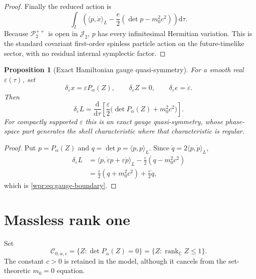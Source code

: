 \documentclass[11pt]{article}
\newtheorem{proposition}[theorem]{Proposition}
\newcommand{\J}{\mathcal J_2}
\newcommand{\Ppos}{\mathcal P_2^{++}}
\newcommand{\rankC}{\operatorname{rank}_{\mathbb C}}
\newcommand{\dd}{\mathrm d}
\begin{document}
\begin{proof}
Finally the reduced action is
\[
 \int_I\left(\langle p,\dot x\rangle_L
 -\frac e2(\det p-m_0^2c^2)\right)\dd\tau.
\]
Because \(\Ppos\) is open in \(\J\), \(p\) has every infinitesimal
Hermitian variation.  This is the standard covariant first-order
spinless particle action on the future-timelike sector, with no
residual internal symplectic factor.
\end{proof}

\begin{proposition}[Exact Hamiltonian gauge quasi-symmetry]
\label{wpr:prop:gauge}
For a smooth real \(\varepsilon(\tau)\), set
\[
 \delta_\varepsilon x=\varepsilon P_\alpha(Z),\qquad
 \delta_\varepsilon Z=0,\qquad
 \delta_\varepsilon e=\dot\varepsilon.
\]
Then
\begin{equation}
 \delta_\varepsilon L
 =
 \frac{\dd}{\dd\tau}
 \left[
 \frac{\varepsilon}{2}
 \bigl(\det P_\alpha(Z)+m_0^2c^2\bigr)
 \right].
 \label{wpr:eq:gauge-boundary}
\end{equation}
For compactly supported \(\varepsilon\) this is an exact gauge
quasi-symmetry, whose phase-space part generates the shell
characteristic where that characteristic is regular.
\end{proposition}
\begin{proof}
Put \(p=P_\alpha(Z)\) and \(q=\det p=\langle p,p\rangle_L\).  Since
\(\dot q=2\langle p,\dot p\rangle_L\),
\begin{align*}
 \delta_\varepsilon L
 &=
 \langle p,\dot\varepsilon p+\varepsilon\dot p\rangle_L
 -\frac{\dot\varepsilon}{2}(q-m_0^2c^2)\\
 &=
 \frac{\dot\varepsilon}{2}(q+m_0^2c^2)
 +\frac{\varepsilon}{2}\dot q,
\end{align*}
which is \eqref{wpr:eq:gauge-boundary}.
\end{proof}


\section{Massless rank one}
Set
\[
 \mathcal C_{0,\alpha,c}
 =\{Z:\det P_\alpha(Z)=0\}
 =\{Z:\rankC Z\leq1\}.
\]
The constant \(c>0\) is retained in the model, although it cancels
from the set-theoretic \(m_0=0\) equation.
\end{document}
